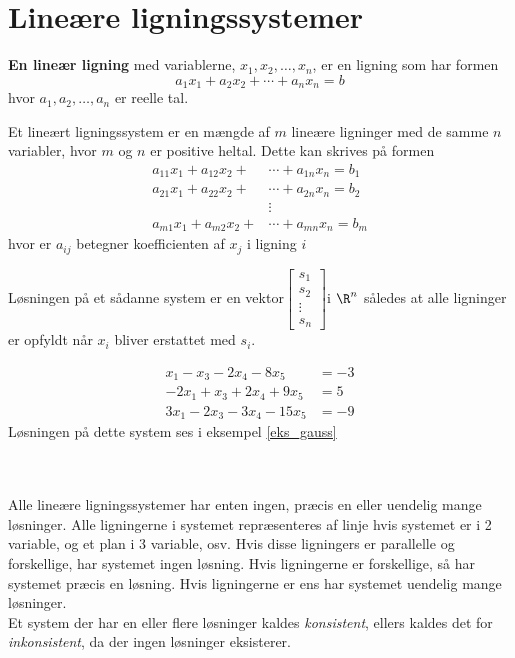 \section{Lineære ligningssystemer }
%

\textbf{En lineær ligning} med variablerne, $x_1,x_2,\ldots ,x_n$, er en ligning som har formen
$$ a_1x_1+a_2x_2+\cdots+a_nx_n=b$$ 
hvor $a_1,a_2,\ldots,a_n$ er reelle tal. 

\begin{defn}{}{}
Et lineært ligningssystem er en mængde af $m$ lineære ligninger  med de samme $n$ variabler, hvor $m$ og $n$ er positive heltal.
Dette kan skrives på formen
\begin{align*}
a_{11}x_1+a_{12}x_2+&\cdots+a_{1n}x_n=b_1\\
a_{21}x_1+a_{22}x_2+&\cdots+a_{2n}x_n=b_2\\
&\vdots\\
a_{m1}x_1+a_{m2}x_2+&\cdots +a_{mn}x_n=b_m
\end{align*}
hvor er $a_{ij}$ betegner koefficienten af $x_j$ i ligning $i$
\end{defn}
\noindent
Løsningen på et sådanne system er en vektor$\begin{bmatrix}
s_1\\
s_2\\
\vdots\\
s_n
\end{bmatrix}
$i $\R ^n$ således at alle ligninger er opfyldt når $x_i$ bliver erstattet med $s_i$.
\begin{eks}\label{eks}
\begin{align*}
x_1-x_3-2x_4-8x_5&=-3 \\
-2x_1+x_3+2x_4+9x_5&=5 \\
3x_1-2x_3-3x_4-15x_5&=-9
\end{align*}
Løsningen på dette system ses i eksempel \ref{eks_gauss}
\end{eks}
\phantom{g}\\\\
Alle lineære ligningssystemer har enten ingen, præcis en eller uendelig mange løsninger.
Alle ligningerne i systemet repræsenteres af linje hvis systemet er i 2 variable, og et plan i 3 variable, osv.
Hvis disse ligningers er parallelle og forskellige, har systemet ingen løsning.
Hvis ligningerne er forskellige, så har systemet præcis en løsning. 
Hvis ligningerne er ens har systemet uendelig mange løsninger.\\
Et system der har en eller flere løsninger kaldes \textit{konsistent}, ellers kaldes det for \textit{inkonsistent}, da der ingen løsninger eksisterer.
